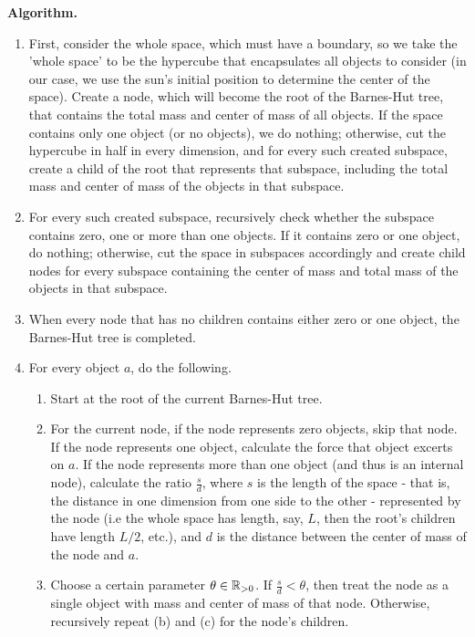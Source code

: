 \textbf{Algorithm.}
\begin{enumerate}
\item First, consider the whole space, which must have a boundary, so we take the 'whole space' to be the hypercube that encapsulates all objects to consider (in our case, we use the sun's initial position to determine the center of the space). 
Create a node, which will become the root of the Barnes-Hut tree, that contains the total mass and center of mass of all objects. 
If the space contains only one object (or no objects), we do nothing; otherwise, cut the hypercube in half in every dimension, and for every such created subspace, create a child of the root that represents that subspace, including the total mass and center of mass of the objects in that subspace.
\item For every such created subspace, recursively check whether the subspace contains zero, one or more than one objects. 
If it contains zero or one object, do nothing; otherwise, cut the space in subspaces accordingly and create child nodes for every subspace containing the center of mass and total mass of the objects in that subspace.
\item When every node that has no children contains either zero or one object, the Barnes-Hut tree is completed.
\item For every object $a$, do the following.
\begin{enumerate}
\item Start at the root of the current Barnes-Hut tree.
\item For the current node, if the node represents zero objects, skip that node. 
If the node represents one object, calculate the force that object excerts on $a$. 
If the node represents more than one object (and thus is an internal node), calculate the ratio $\frac{s}{d}$, where $s$ is the length of the space - that is, the distance in one dimension from one side to the other - represented by the node (i.e the whole space has length, say, $L$, then the root's children have length $L/2$, etc.), and $d$ is the distance between the center of mass of the node and $a$.
\item Choose a certain parameter $\theta \in \mathbb{R}_{>0}$. If $\frac{s}{d}<\theta$, then treat the node as a single object with mass and center of mass of that node. 
Otherwise, recursively repeat (b) and (c) for the node's children.
\end{enumerate}
\end{enumerate}

